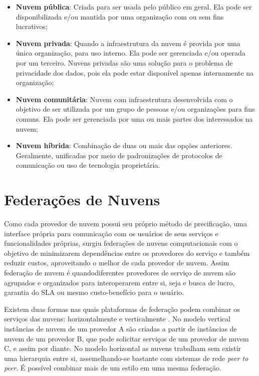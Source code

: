 \begin{itemize}
	\item \textbf{Nuvem pública}: Criada para ser usada pelo público em geral. Ela pode ser disponibilizada e/ou mantida por uma organização com ou sem fins lucrativos;
	\item \textbf{Nuvem privada}: Quando a infraestrutura da nuvem é provida por uma única organização, para uso interno. Ela pode ser gerenciada e/ou operada por um terceiro. Nuvens privadas são uma solução para o problema de privacidade dos dados, pois ela pode estar disponível apenas internamente na organização;
	\item \textbf{Nuvem comunitária}: Nuvem com infraestrutura desenvolvida com o objetivo de ser utilizada por um grupo de pessoas e/ou organizações para fins comuns. Ela pode ser gerenciada por uma ou mais partes dos interessados na nuvem;
	\item \textbf{Nuvem híbrida}: Combinação de duas ou mais das opções anteriores. Geralmente, unificadas por meio de padronizações de protocolos de comunicação ou uso de tecnologia proprietária.
\end{itemize}

\section{Federações de Nuvens}

Como cada provedor de nuvem possui seu próprio método de precificação, uma interface própria para comunicação com os usuários de seus serviços e funcionalidades próprias, surgiu federações de nuvens computacionais com o objetivo de minimizarem dependências entre os provedores do serviço e também reduzir custos, aproveitando o melhor de cada provedor de nuvem. Assim federação de nuvem é quandodiferentes provedores de serviço de nuvem são agrupados e organizados para interoperarem entre si, seja e busca de lucro, garantia do \acrshort{SLA} ou mesmo custo-benefício para o usuário.

Existem duas formas nas quais plataformas de federação podem combinar os serviços das nuvens: horizontalmente e verticalmente \cite{5557976}\cite{7835207}. No modelo vertical instâncias de nuvem de um provedor A são criadas a partir de instâncias de nuvem de um provedor B, que pode solicitar serviços de um provedor de nuvem C, e assim por diante. No modelo horizontal as nuvens trabalham sem existir uma hierarquia entre si, assemelhando-se bastante com sistemas de rede \textit{peer to peer}. É possível combinar mais de um estilo em uma mesma federação.

